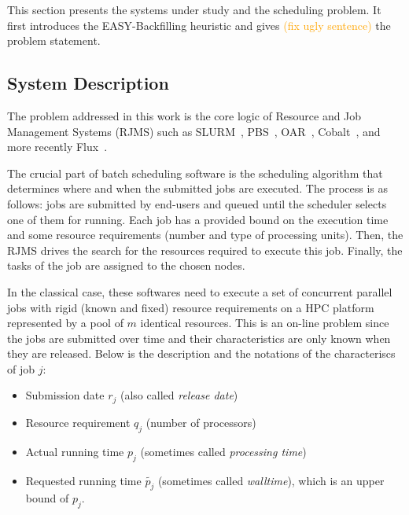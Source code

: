 \documentclass[sigconf]{acmart}
\begin{document}
This section presents the systems under study and the scheduling problem.  It
first introduces the EASY-Backfilling heuristic and gives
\textcolor{orange}{(fix ugly sentence)} the problem statement.

\subsection{System Description}
\label{sub:sysdesc}

The problem addressed in this work is the core logic of Resource and Job
Management Systems (RJMS) such as SLURM~\cite{SLURMdocSCHED}, PBS~\cite{PBSdoc},
OAR~\cite{capit2005batch}, Cobalt~\cite{Cobalt}, and more recently Flux~\cite{flux2014}.

The crucial part of batch scheduling software is the scheduling algorithm that determines
where and when the submitted jobs are executed. The process is as follows: jobs
are submitted by end-users and queued until the scheduler selects one of them
for running. Each job has a provided bound on the execution time and some
resource requirements (number and type of processing units). Then, the RJMS
drives the search for the resources required to execute this job. Finally, the
tasks of the job are assigned to the chosen nodes.

In the classical case, these softwares need to execute a set of concurrent
parallel jobs with rigid (known and fixed) resource requirements on a HPC
platform represented by a pool of $m$ identical resources. This is an on-line
problem since the jobs are submitted over time and their characteristics are only known when they are released.
Below is the description and the notations of the characteriscs of job $j$:

\begin{itemize}
  \item Submission date $r_j$ (also called \textit{release date})

  \item Resource requirement $q_j$ (number of processors)

  \item Actual running time $p_j$ (sometimes called \textit{processing time})

  \item Requested running time $\widetilde{p_j}$ (sometimes called \textit{walltime}), which is an upper bound of $p_j$.

\end{itemize}
\end{document}
